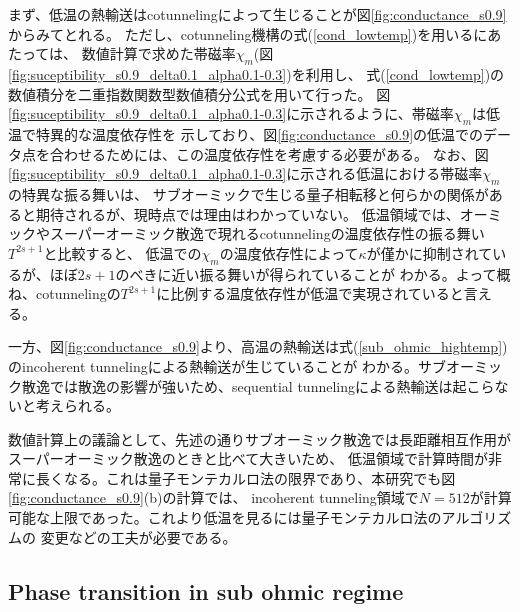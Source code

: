 まず、低温の熱輸送はcotunnelingによって生じることが図\ref{fig:conductance_s0.9}からみてとれる。
ただし、cotunneling機構の式(\ref{cond_lowtemp})を用いるにあたっては、
数値計算で求めた帯磁率$\chi_m$(図\ref{fig:suceptibility_s0.9_delta0.1_alpha0.1-0.3})を利用し、
式(\ref{cond_lowtemp})の数値積分を二重指数関数型数値積分公式\cite{double_exp}を用いて行った。
図\ref{fig:suceptibility_s0.9_delta0.1_alpha0.1-0.3}に示されるように、帯磁率$\chi_m$は低温で特異的な温度依存性を
示しており、図\ref{fig:conductance_s0.9}の低温でのデータ点を合わせるためには、この温度依存性を考慮する必要がある。
なお、図\ref{fig:suceptibility_s0.9_delta0.1_alpha0.1-0.3}に示される低温における帯磁率$\chi_m$の特異な振る舞いは、
サブオーミックで生じる量子相転移と何らかの関係があると期待されるが、現時点では理由はわかっていない。
低温領域では、オーミックやスーパーオーミック散逸で現れるcotunnelingの温度依存性の振る舞い$T^{2s+1}$と比較すると、
低温での$\chi_m$の温度依存性によって$\kappa$が僅かに抑制されているが、ほぼ$2s+1$のべきに近い振る舞いが得られていることが
わかる。よって概ね、cotunnelingの$T^{2s+1}$に比例する温度依存性が低温で実現されていると言える。

一方、図\ref{fig:conductance_s0.9}より、高温の熱輸送は式(\ref{sub_ohmic_hightemp})のincoherent tunnelingによる熱輸送が生じていることが
わかる。サブオーミック散逸では散逸の影響が強いため、sequential tunnelingによる熱輸送は起こらないと考えられる。

数値計算上の議論として、先述の通りサブオーミック散逸では長距離相互作用がスーパーオーミック散逸のときと比べて大きいため、
低温領域で計算時間が非常に長くなる。これは量子モンテカルロ法の限界であり、本研究でも図\ref{fig:conductance_s0.9}(b)の計算では、
incoherent tunneling領域で$N=512$が計算可能な上限であった。これより低温を見るには量子モンテカルロ法のアルゴリズムの
変更などの工夫が必要である。

\subsection{Phase transition in sub ohmic regime}
\label{sec:phasetransition}

